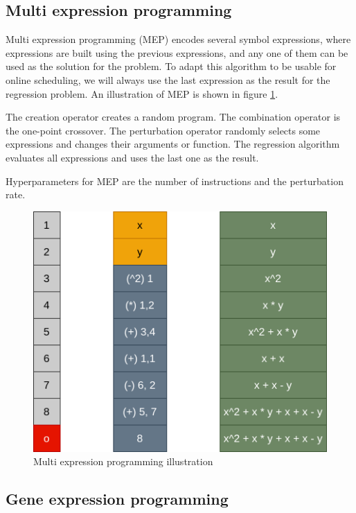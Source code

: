\subsection{Multi expression programming}

Multi expression programming (MEP) \citep{mep} encodes several symbol expressions, where expressions are built using the previous expressions, and any one of them can be used as the solution for the problem. To adapt this algorithm to be usable for online scheduling, we will always use the last expression as the result for the regression problem. An illustration of MEP is shown in figure \ref{fig:mep}.

The creation operator creates a random program. The combination operator is the one-point crossover. The perturbation operator randomly selects some expressions and changes their arguments or function. The regression algorithm evaluates all expressions and uses the last one as the result.

Hyperparameters for MEP are the number of instructions and the perturbation rate.

\begin{figure}[!htbp]
	\centering
	\includegraphics[scale=0.3]{../images/mep.png}
	\caption{Multi expression programming illustration}
    \label{fig:mep}
\end{figure}

\subsection{Gene expression programming}

